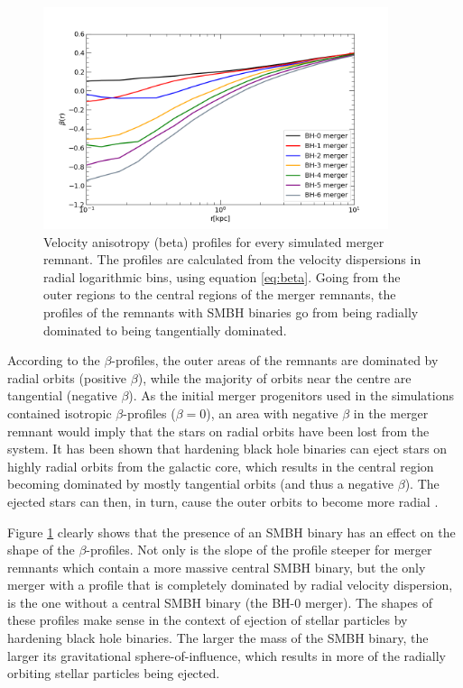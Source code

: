 \documentclass[english, twoside]{HYgradu}
\begin{document}
\begin{figure}
	\centering
	\includegraphics[width=0.9\textwidth]{beta_no_rb.png}
	\caption{Velocity anisotropy (beta) profiles for every simulated merger remnant. The profiles are calculated from the velocity dispersions in radial logarithmic bins, using equation \ref{eq:beta}. Going from the outer regions to the central regions of the merger remnants, the profiles of the remnants with SMBH binaries go from being radially dominated to being tangentially dominated.}
	\label{figure:beta_no_rb}
\end{figure}

According to the $\beta$-profiles, the outer areas of the remnants are dominated by radial orbits (positive $\beta$), while the majority of orbits near the centre are tangential (negative $\beta$). As the initial merger progenitors used in the simulations contained isotropic $\beta$-profiles ($\beta = 0$), an area with negative $\beta$ in the merger remnant would imply that the stars on radial orbits have been lost from the system. It has been shown that hardening black hole binaries can eject stars on highly radial orbits from the galactic core, which results in the central region becoming dominated by mostly tangential orbits (and thus a negative $\beta$). The ejected stars can then, in turn, cause the outer orbits to become more radial \citep{Quinlan1997, Milosavljevic2001, Thomas2014}. 

Figure \ref{figure:beta_no_rb} clearly shows that the presence of an SMBH binary has an effect on the shape of the $\beta$-profiles. Not only is the slope of the profile steeper for merger remnants which contain a more massive central SMBH binary, but the only merger with a profile that is completely dominated by radial velocity dispersion, is the one without a central SMBH binary (the BH-0 merger). The shapes of these profiles make sense in the context of ejection of stellar particles by hardening black hole binaries. The larger the mass of the SMBH binary, the larger its gravitational sphere-of-influence, which results in more of the radially orbiting stellar particles being ejected.
\end{document}
